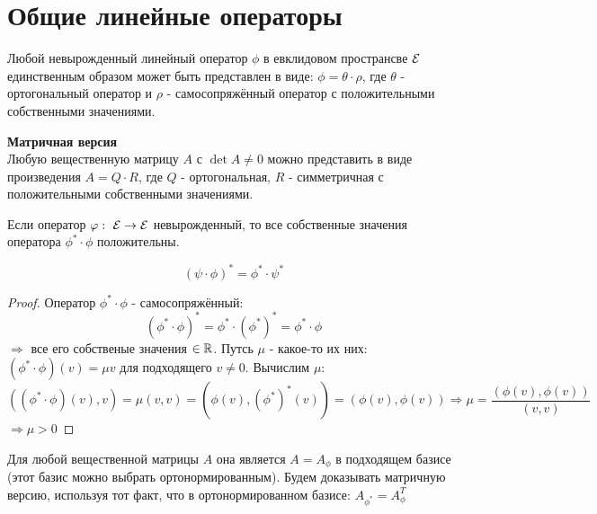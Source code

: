 \section{Общие линейные операторы}
\begin{theorem}
    Любой невырожденный линейный оператор $\phi$ в евклидовом пространсве $\mathcal{E}$ единственным образом может быть представлен в виде: $\phi = \theta \cdot \rho$, где $\theta$ - ортогональный оператор и $\rho$ - самосопряжённый оператор с положительными собственными значениями. 
\end{theorem}
\begin{theorem} \textbf{Матричная версия}\\
    Любую вещественную матрицу $A$ с $\det A \neq 0$ можно представить в виде произведения $A = Q \cdot R$, где $Q$ - ортогональная, $R$ - симметричная с положительными собственными значениями.      
\end{theorem}
\begin{lemma}
    Если оператор $\varphi: \ \mathcal{E} \to \mathcal{E}$ невырожденный, то все собственные значения оператора $\phi^* \cdot \phi$ положительны.  
\end{lemma} 
\begin{subtheorem}
    $$(\psi \cdot \phi)^* = \phi^* \cdot \psi^*$$ 
\end{subtheorem} 
\begin{proof}
    Оператор $\phi^* \cdot \phi$ - самосопряжённый: 
    $$(\phi^* \cdot \phi)^* = \phi^* \cdot (\phi^*)^* = \phi^* \cdot \phi$$
    $\Longrightarrow $ все его собственые значения $\in \mathbb{R}$. Путсь $\mu$ - какое-то их них: $(\phi^* \cdot \phi)(v) = \mu v$ для подходящего $v \neq 0$. Вычислим $\mu$: 
    $$((\phi^* \cdot \phi)(v),v) = \mu(v,v) = (\phi(v),(\phi^*)^*(v)) = (\phi(v), \phi(v)) \Longrightarrow \mu = \frac{(\phi(v),\phi(v))}{(v,v)}$$
    $\Longrightarrow \mu>0$     
\end{proof} 
\begin{remark}
    Для любой вещественной матрицы $A$ она является $A = A_\phi$ в подходящем базисе (этот базис можно выбрать ортонормированным). Будем доказывать матричную версию, используя тот факт, что в ортонормированном базисе: $A_{\phi^*} = A_\phi^T$  
\end{remark}
